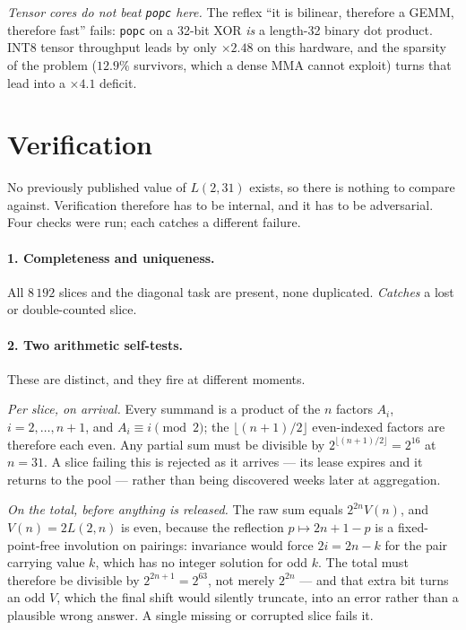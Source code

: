 \documentclass[11pt,a4paper]{article}
\begin{document}
\emph{Tensor cores do not beat \texttt{popc} here.} The reflex ``it is bilinear,
therefore a GEMM, therefore fast'' fails: \texttt{popc} on a 32-bit XOR
\emph{is} a length-32 binary dot product. INT8 tensor throughput leads by only
$\times 2.48$ on this hardware, and the sparsity of the problem ($12.9\%$
survivors, which a dense MMA cannot exploit) turns that lead into a $\times 4.1$
deficit.

\section{Verification}

No previously published value of $L(2,31)$ exists, so there is nothing to
compare against. Verification therefore has to be internal, and it has to be
adversarial. Four checks were run; each catches a different failure.

\paragraph{1. Completeness and uniqueness.} All $8\,192$ slices and the
diagonal task are present, none duplicated. \emph{Catches} a lost or
double-counted slice.

\paragraph{2. Two arithmetic self-tests.} These are distinct, and they fire at
different moments.

\emph{Per slice, on arrival.} Every summand is a product of the $n$ factors
$A_i$, $i = 2,\dots,n+1$, and $A_i \equiv i \pmod 2$; the
$\lfloor (n+1)/2 \rfloor$ even-indexed factors are therefore each even. Any
partial sum must be divisible by $2^{\lfloor (n+1)/2 \rfloor} = 2^{16}$ at
$n=31$. A slice failing this is rejected as it arrives --- its lease expires and
it returns to the pool --- rather than being discovered weeks later at
aggregation.

\emph{On the total, before anything is released.} The raw sum equals
$2^{2n} V(n)$, and $V(n) = 2L(2,n)$ is even, because the reflection
$p \mapsto 2n+1-p$ is a fixed-point-free involution on pairings: invariance
would force $2i = 2n-k$ for the pair carrying value $k$, which has no integer
solution for odd $k$. The total must therefore be divisible by
$2^{2n+1} = 2^{63}$, not merely $2^{2n}$ --- and that extra bit turns an odd
$V$, which the final shift would silently truncate, into an error rather than a
plausible wrong answer. A single missing or corrupted slice fails it.
\end{document}

